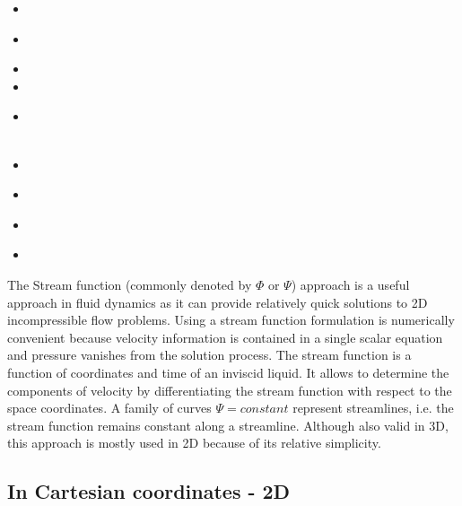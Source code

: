 \begin{scriptsize}
\begin{itemize}
\item[\nineteenninetythree] 
\textcite{hayk93}
\item[\nineteenninetyfour] 
\textcite{hayu94}
\item[\nineteenninetyfive] 
\item[\nineteenninetysix] 
\item[\nineteenninetyseven] 
\\
\textcite{olwh97}\\
\item[\nineteenninetyeight] 
\textcite{giju98}
\item[\nineteenninetynine] 
\\
\item[\twothousandeight] 
\textcite{vanv08}
\item[\twothousandeleven] 
\textcite{vanj11}
\end{itemize}
\end{scriptsize}





\vspace{0.5cm}

The Stream function (commonly denoted by $\Phi$ or $\Psi$) approach is a useful approach in 
fluid dynamics as it 
can provide relatively quick solutions to 2D incompressible flow problems.
Using a stream function
formulation is numerically convenient because velocity information is contained in a single scalar equation
and pressure vanishes from the solution process.
The stream function is a function of coordinates and time of an inviscid liquid.
It allows to determine the components of velocity by differentiating the stream function 
with respect to the space coordinates. 
A family of curves $\Psi = constant$ represent {\color{olive} streamlines}, i.e. 
the stream function remains constant along a streamline. 
Although also valid in 3D, this approach is mostly used in 2D because of its 
relative simplicity.

\subsection{In Cartesian coordinates - 2D}

